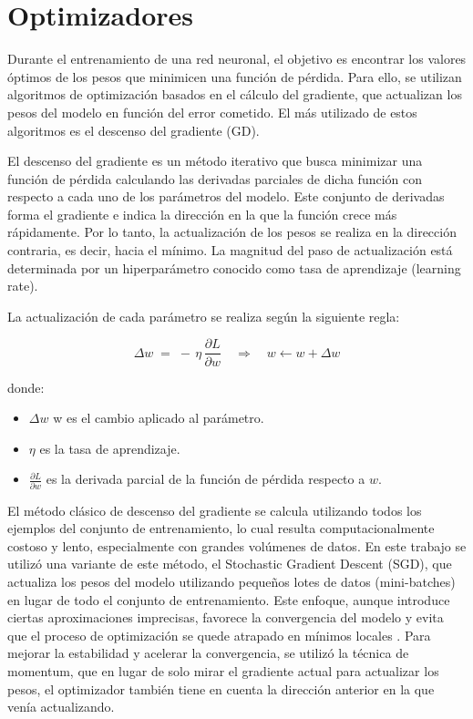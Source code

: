 \section{Optimizadores}
Durante el entrenamiento de una red neuronal, el objetivo es encontrar los valores óptimos de los pesos que minimicen una función de pérdida. Para ello, se utilizan algoritmos de optimización basados en el cálculo del gradiente, que actualizan los pesos del modelo en función del error cometido. El más utilizado de estos algoritmos es el descenso del gradiente (GD).

El descenso del gradiente es un método iterativo que busca minimizar una función de pérdida calculando las derivadas parciales de dicha función con respecto a cada uno de los parámetros del modelo. Este conjunto de derivadas forma el gradiente e indica la dirección en la que la función crece más rápidamente. Por lo tanto, la actualización de los pesos se realiza en la dirección contraria, es decir, hacia el mínimo. La magnitud del paso de actualización está determinada por un hiperparámetro conocido como tasa de aprendizaje (learning rate).

La actualización de cada parámetro  se realiza según la siguiente regla:

\[
\Delta w \;=\; -\,\eta\,\frac{\partial L}{\partial w} \quad\Longrightarrow\quad
w \leftarrow w + \Delta w
\]

donde:
\begin{itemize}
	\item $\Delta w$ w es el cambio aplicado al parámetro.
	\item $\eta$ es la tasa de aprendizaje.
	\item $\frac{\partial L}{\partial w}$ es la derivada parcial de la función de pérdida respecto a $w$.
\end{itemize}

El método clásico de descenso del gradiente se calcula utilizando todos los ejemplos del conjunto de entrenamiento, lo cual resulta computacionalmente costoso y lento, especialmente con grandes volúmenes de datos. En este trabajo se utilizó una variante de este método, el Stochastic Gradient Descent (SGD), que actualiza los pesos del modelo utilizando pequeños lotes de datos (mini-batches) en lugar de todo el conjunto de entrenamiento. Este enfoque, aunque introduce ciertas aproximaciones imprecisas, favorece la convergencia del modelo y evita que el proceso de optimización se quede atrapado en mínimos locales \parencites{stevens2020deep}. Para mejorar la estabilidad y acelerar la convergencia, se utilizó la técnica de momentum, que en lugar de solo mirar el gradiente actual para actualizar los pesos, el optimizador también tiene en cuenta la dirección anterior en la que venía actualizando.

